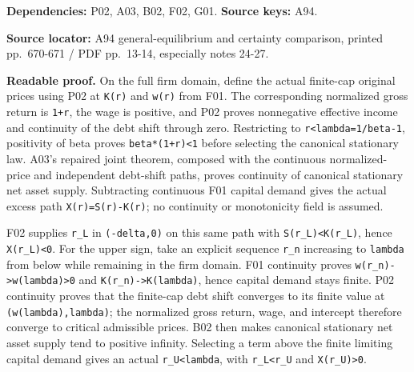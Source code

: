 \documentclass[
  11pt,
]{article}
\let\LedgerOriginalTexttt\texttt
\renewcommand{\texttt}[1]{{\small\LedgerOriginalTexttt{#1}}}
\begin{document}
\textbf{Dependencies:} P02, A03, B02, F02, G01. \textbf{Source keys:}
A94.

\textbf{Source locator:} A94 general-equilibrium and certainty
comparison, printed pp.~670-671 / PDF pp.~13-14, especially notes 24-27.

\textbf{Readable proof.} On the full firm domain, define the actual
finite-cap original prices using P02 at \texttt{K(r)} and \texttt{w(r)}
from F01. The corresponding normalized gross return is \texttt{1+r}, the
wage is positive, and P02 proves nonnegative effective income and
continuity of the debt shift through zero. Restricting to
\texttt{r\textless{}lambda=1/beta-1}, positivity of beta proves
\texttt{beta*(1+r)\textless{}1} before selecting the canonical
stationary law. A03's repaired joint theorem, composed with the
continuous normalized-price and independent debt-shift paths, proves
continuity of canonical stationary net asset supply. Subtracting
continuous F01 capital demand gives the actual excess path
\texttt{X(r)=S(r)-K(r)}; no continuity or monotonicity field is assumed.

F02 supplies \texttt{r\_L} in \texttt{(-delta,0)} on this same path with
\texttt{S(r\_L)\textless{}K(r\_L)}, hence \texttt{X(r\_L)\textless{}0}.
For the upper sign, take an explicit sequence \texttt{r\_n} increasing
to \texttt{lambda} from below while remaining in the firm domain. F01
continuity proves
\texttt{w(r\_n)-\textgreater{}w(lambda)\textgreater{}0} and
\texttt{K(r\_n)-\textgreater{}K(lambda)}, hence capital demand stays
finite. P02 continuity proves that the finite-cap debt shift converges
to its finite value at \texttt{(w(lambda),lambda)}; the normalized gross
return, wage, and intercept therefore converge to critical admissible
prices. B02 then makes canonical stationary net asset supply tend to
positive infinity. Selecting a term above the finite limiting capital
demand gives an actual \texttt{r\_U\textless{}lambda}, with
\texttt{r\_L\textless{}r\_U} and \texttt{X(r\_U)\textgreater{}0}.
\end{document}
